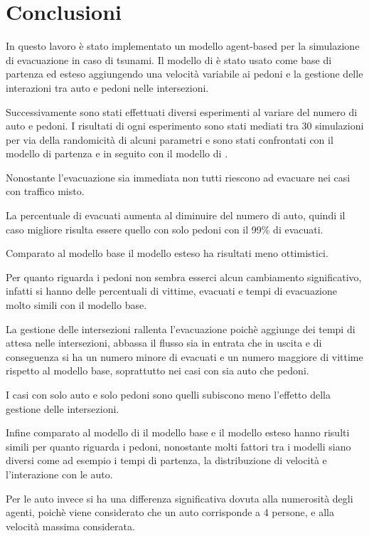 \section{Conclusioni}
\label{sec:conclusione}
In questo lavoro è stato implementato un modello agent-based per la simulazione di evacuazione in caso di tsunami.
Il modello di \textcite{wang2016agent} è stato usato come base di partenza ed esteso aggiungendo una velocità
variabile ai pedoni e la gestione delle interazioni tra auto e pedoni nelle intersezioni.

Successivamente sono stati effettuati diversi esperimenti al variare del numero di auto e pedoni.
I risultati di ogni esperimento sono stati mediati tra 30 simulazioni per via della randomicità di alcuni parametri
e sono stati confrontati con il modello di partenza e in seguito con il modello di \textcite{wang2021novel}.

Nonostante l'evacuazione sia immediata non tutti riescono ad evacuare nei casi con traffico misto.

La percentuale di evacuati aumenta al diminuire del numero di auto, quindi il caso migliore risulta essere quello con solo pedoni
con il 99\% di evacuati.

Comparato al modello base il modello esteso ha risultati meno ottimistici.

Per quanto riguarda i pedoni non sembra esserci alcun cambiamento significativo,
infatti si hanno delle percentuali di vittime, evacuati e tempi di evacuazione molto simili con il modello base.

La gestione delle intersezioni rallenta l'evacuazione poichè aggiunge dei tempi di attesa nelle intersezioni,
abbassa il flusso sia in entrata che in uscita e di conseguenza si ha un numero minore di evacuati e
un numero maggiore di vittime rispetto al modello base, soprattutto nei casi con sia auto che pedoni.

I casi con solo auto e solo pedoni sono quelli subiscono meno l'effetto della gestione delle intersezioni.

Infine comparato al modello di \textcite{wang2021novel} il modello base e il modello esteso hanno risulti simili per quanto riguarda i pedoni, nonostante
molti fattori tra i modelli siano diversi come ad esempio i tempi di partenza, la distribuzione di velocità e l'interazione con le auto.

Per le auto invece si ha una differenza significativa dovuta alla numerosità degli agenti, poichè viene considerato che un auto corrisponde a 4 persone, e alla 
velocità massima considerata. 


